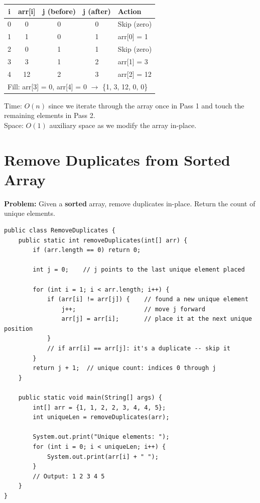 \documentclass[12pt,a4paper,oneside]{book}
\begin{document}
\begin{dryrun}[Dry Run: arr = \{0, 1, 0, 3, 12\}]
\begin{center}
\begin{tabular}{ccccl}
\toprule
\textbf{i} & \textbf{arr[i]} & \textbf{j (before)} & \textbf{j (after)} & \textbf{Action}\\
\midrule
0 & 0  & 0 & 0 & Skip (zero)\\
1 & 1  & 0 & 1 & arr[0] = 1\\
2 & 0  & 1 & 1 & Skip (zero)\\
3 & 3  & 1 & 2 & arr[1] = 3\\
4 & 12 & 2 & 3 & arr[2] = 12\\
\midrule
\multicolumn{5}{l}{Fill: arr[3] = 0, arr[4] = 0 $\to$ \{1, 3, 12, 0, 0\}}\\
\bottomrule
\end{tabular}
\end{center}
\end{dryrun}

\begin{complexity}
Time: $O(n)$ since we iterate through the array once in Pass 1 and touch the remaining elements in Pass 2.\\
Space: $O(1)$ auxiliary space as we modify the array in-place.
\end{complexity}

\section{Remove Duplicates from Sorted Array}

\textbf{Problem:} Given a \textbf{sorted} array, remove duplicates in-place. Return the count of unique elements.

\begin{lstlisting}[caption={Remove Duplicates from Sorted Array --- Two Pointer}]
public class RemoveDuplicates {
    public static int removeDuplicates(int[] arr) {
        if (arr.length == 0) return 0;

        int j = 0;    // j points to the last unique element placed

        for (int i = 1; i < arr.length; i++) {
            if (arr[i] != arr[j]) {    // found a new unique element
                j++;                   // move j forward
                arr[j] = arr[i];       // place it at the next unique position
            }
            // if arr[i] == arr[j]: it's a duplicate -- skip it
        }
        return j + 1;  // unique count: indices 0 through j
    }

    public static void main(String[] args) {
        int[] arr = {1, 1, 2, 2, 3, 4, 4, 5};
        int uniqueLen = removeDuplicates(arr);

        System.out.print("Unique elements: ");
        for (int i = 0; i < uniqueLen; i++) {
            System.out.print(arr[i] + " ");
        }
        // Output: 1 2 3 4 5
    }
}
\end{lstlisting}
\end{document}
